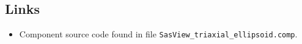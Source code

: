 \subsection*{Links}
\begin{itemize}
  \item Component source code found in file \texttt{SasView\_triaxial\_ellipsoid.comp}.
\end{itemize}
